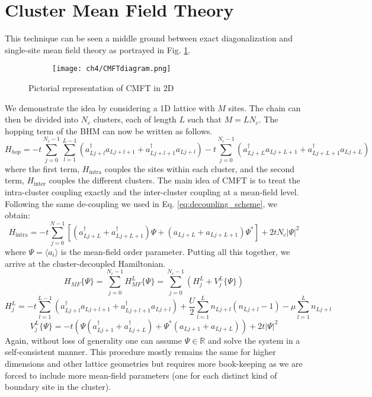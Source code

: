 \section{Cluster Mean Field Theory}
This technique can be seen a middle ground between exact diagonalization and single-site mean field theory as portrayed in Fig. \ref{fig:cmft_diagram}.
\begin{figure}[!htb]
    \centering
    \begin{subfigure}[b]{\textwidth}  %
        \centering
        \texttt{[image: ch4/CMFTdiagram.png]}
    \end{subfigure}
    \caption{Pictorial representation of CMFT in 2D}
    \label{fig:cmft_diagram}
\end{figure}
\FloatBarrier \!\!\!\!\!\!\!\!\!\!\!

 We demonstrate the idea by considering a 1D lattice with $M$ sites. The chain can then be divided into $N_c$ clusters, each of length $L$ such that $M = LN_c$. The hopping term of the BHM can now be written as follows.
 \begin{equation}
    H_{hop} = -t\sum_{j=0}^{N_c - 1}\sum_{l = 1}^{L-1} (a_{Lj+l}^{\dagger}a_{Lj+l+1} + a_{Lj+l + 1}^{\dagger}a_{Lj+l}) - t\sum_{j=0}^{N_c-1}(a_{Lj+L}^{\dagger}a_{Lj+L+1} + a_{Lj+L+1}^{\dagger}a_{Lj+L})
 \end{equation}
where the first term, $H_{\text{intra}}$ couples the sites within each cluster, and the second term, $H_{\text{inter}}$ couples the different clusters. The main idea of CMFT is to treat the intra-cluster coupling exactly and the inter-cluster coupling at a mean-field level. Following the same de-coupling we used in Eq. \eqref{eq:decoupling_scheme}, we obtain:
\begin{equation}
    H_{\text{intra}} = -t \sum_{j=0}^{N-1}[(a_{Lj+L}^{\dagger} + a_{Lj+L+1}^{\dagger})\Psi + (a_{Lj+L} + a_{Lj+L+1})\Psi^*] + 2tN_c|\Psi|^2
\end{equation}
where $\Psi = \langle a_i \rangle$ is the mean-field order parameter. Putting all this together, we arrive at the cluster-decoupled Hamiltonian.
\begin{equation}
    H_{MF}\{\Psi\} = \sum_{j=0}^{N_c-1} H_{MF}^L\{\Psi\} = \sum_{j=0}^{N_c-1} (H_j^L + V_j^L\{\Psi\})
\end{equation}
\begin{equation}
    H_j^L = -t\sum_{l=1}^{L-1}(a_{Lj + l}^{\dagger}a_{Lj + l+1} + a_{Lj + l+1}^{\dagger}a_{Lj + l}) + \frac{U}{2}\sum_{l=1}^L n_{Lj + l}(n_{Lj + l} - 1) - \mu \sum_{l=1}^L n_{Lj + l}
\end{equation}
\begin{equation}
    V^L_j\{\Psi\} = -t(\Psi(a_{Lj + 1}^{\dagger} + a_{Lj + L}^{\dagger}) + \Psi^*(a_{Lj + 1} + a_{Lj + L})) + 2t|\Psi|^2    
\end{equation}
Again, without loss of generality one can assume $\Psi \in \mathbb{R}$ and solve the system in a self-consistent manner. This procedure mostly remains the same for higher dimensions\cite{McIntosh_2012} and other lattice geometries\cite{Malakar_2020, Malakar_2023} but requires more book-keeping as we are forced to include more mean-field parameters (one for each distinct kind of boundary site in the cluster). 
\newpage
